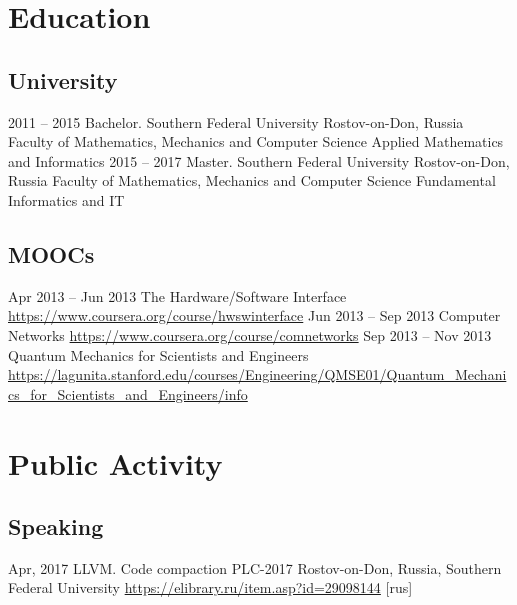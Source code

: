 \documentclass[11pt,a4paper]{moderncv}
\newcommand{\EngRus}[2]{#1}
\newcommand{\BirthPlaceOfValour}{\EngRus{Rostov-on-Don, Russia}{Ростов-на-Дону, Россия}}
\begin{document}
\pagebreak

\section{\EngRus{Education}{Образование}}
  \subsection{\EngRus{University}{Университет}}
    \cventry
      {2011 -- 2015}
      {\EngRus{Bachelor. Southern Federal University}{Бакалавриат. Южный Федеральный Университет}}
      {\BirthPlaceOfValour}
      {\EngRus{Faculty of Mathematics, Mechanics and Computer Science}
      {Институт математики, механики и компьютерных наук им. И.И. Воровича}}
      {\EngRus{Applied Mathematics and Informatics}{Прикладная математика и информатика}}
      {}
    \cventry
      {2015 -- 2017}
      {\EngRus{Master. Southern Federal University}{Магистратура. Южный Федеральный Университет}}
      {\BirthPlaceOfValour}
      {\EngRus{Faculty of Mathematics, Mechanics and Computer Science}
      {Институт математики, механики и компьютерных наук им. И.И. Воровича}}
      {\EngRus{Fundamental Informatics and IT}{Фундаментальная информатика и информационные технологии}}
      {}
  \subsection{\EngRus{MOOCs}{Онлайн курсы}}
    \cventry
      {\EngRus{Apr}{Апрель} 2013 -- \EngRus{Jun}{Июнь} 2013}
      {The Hardware/Software Interface}
      {\newline\url{https://www.coursera.org/course/hwswinterface}}
      {}{}{}
    \cventry
      {\EngRus{Jun}{Июнь} 2013 -- \EngRus{Sep}{Сентябрь} 2013}
      {Computer Networks}
      {\newline\url{https://www.coursera.org/course/comnetworks}}
      {}{}{}
    \cventry
      {\EngRus{Sep}{Сентябрь} 2013 -- \EngRus{Nov}{Ноябрь} 2013}
      {Quantum Mechanics for Scientists and Engineers}
      {\newline\url{https://lagunita.stanford.edu/courses/Engineering/QMSE01/Quantum_Mechanics_for_Scientists_and_Engineers/info}}
      {}{}{}

\section{\EngRus{Public Activity}{Публичная деятельность}}
  \subsection{\EngRus{Speaking}{Конференции}}
    \cventry
      {\EngRus{Apr}{Апрель}, 2017}
      {\EngRus{LLVM. Code compaction}{Преобразование по уплотнению кода в LLVM}}
      {\EngRus{PLC-2017}{Языки программирования и компиляторы 2017}}
      {\BirthPlaceOfValour, \EngRus{Southern Federal University}{Южный Федеральный Университет}}
      {\newline\url{https://elibrary.ru/item.asp?id=29098144} \EngRus{[rus]}{}}
      {}{}
\end{document}
